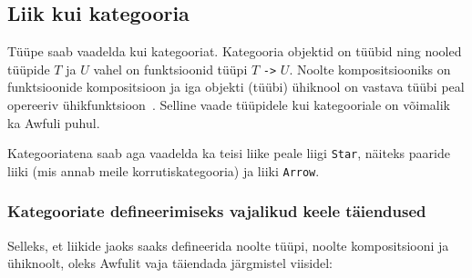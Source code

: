 \documentclass[12pt]{article}
\begin{document}
    \subsection{Liik kui kategooria}
      Tüüpe saab vaadelda kui kategooriat. Kategooria objektid on tüübid ning nooled tüüpide $T$ ja $U$ vahel on funktsioonid tüüpi $T$ \verb!->! $U$. Noolte kompositsiooniks on funktsioonide kompositsioon ja iga objekti (tüübi) ühiknool on vastava tüübi peal opereeriv ühikfunktsioon~\cite{Car, Fas}. Selline vaade tüüpidele kui kategooriale on võimalik ka Awfuli puhul.

      Kategooriatena saab aga vaadelda ka teisi liike peale liigi \verb!Star!, näiteks paaride liiki (mis annab meile korrutiskategooria) ja liiki \verb!Arrow!.
      \subsubsection{Kategooriate defineerimiseks vajalikud keele täiendused}
        Selleks, et liikide jaoks saaks defineerida noolte tüüpi, noolte kompositsiooni ja ühiknoolt, oleks Awfulit vaja täiendada järgmistel viisidel:
\end{document}
